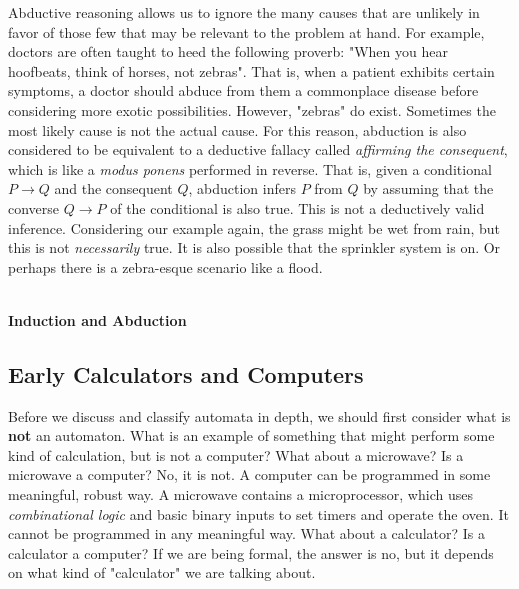 Abductive reasoning allows us to ignore the many causes that are unlikely in favor of those few that may be relevant to the problem at hand. For example, doctors are often taught to heed the following proverb: "When you hear hoofbeats, think of horses, not zebras". That is, when a patient exhibits certain symptoms, a doctor should abduce from them a commonplace disease before considering more exotic possibilities. However, "zebras" do exist. Sometimes the most likely cause is not the actual cause. For this reason, abduction is also considered to be equivalent to a deductive fallacy called \textit{affirming the consequent}, which is like a \textit{modus ponens} performed in reverse. That is, given a conditional $P\rightarrow Q$ and the consequent $Q$, abduction infers $P$ from $Q$ by assuming that the converse $Q\rightarrow P$ of the conditional is also true. This is not a deductively valid inference. Considering our example again, the grass might be wet from rain, but this is not \textit{necessarily} true. It is also possible that the sprinkler system is on. Or perhaps there is a zebra-esque scenario like a flood. \\\\


\begin{tcolorbox}[breakable, enhanced, colback=textbook-blue, sharp corners]
	\vspace{2mm}
	\begin{center}
		\textbf{Induction and Abduction}
	\end{center}
	\vspace{1mm}
	
	\vspace{1mm}
\end{tcolorbox}
\vspace{7mm}


\subsection*{Early Calculators and Computers}

Before we discuss and classify automata in depth, we should first consider what is \textbf{not} an automaton. What is an example of something that might perform some kind of calculation, but is not a computer? What about a microwave? Is a microwave a computer? No, it is not. A computer can be programmed in some meaningful, robust way. A microwave contains a microprocessor, which uses \textit{combinational logic} and basic binary inputs to set timers and operate the oven. It cannot be programmed in any meaningful way. What about a calculator? Is a calculator a computer? If we are being formal, the answer is no, but it depends on what kind of "calculator" we are talking about. \\

